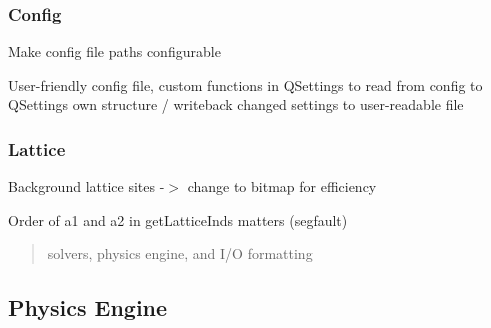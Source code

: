 \subsubsection*{Config}


\begin{DoxyItemize}
\item Make config file paths configurable
\item User-\/friendly config file, custom functions in Q\+Settings to read from config to Q\+Setting\textquotesingle{}s own structure / writeback changed settings to user-\/readable file
\end{DoxyItemize}

\subsubsection*{Lattice}


\begin{DoxyItemize}
\item Background lattice sites -\/$>$ change to bitmap for efficiency
\item Order of a1 and a2 in get\+Lattice\+Inds matters (segfault)
\end{DoxyItemize}

\begin{quote}
solvers, physics engine, and I/O formatting \end{quote}
\subsection*{Physics Engine}


